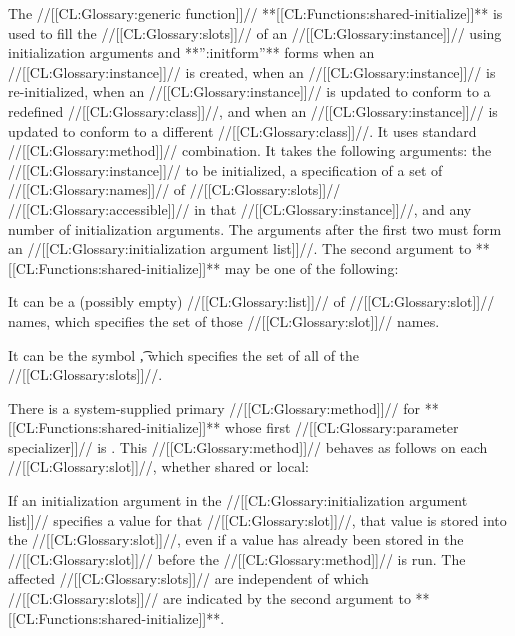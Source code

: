  
                       The //[[CL:Glossary:generic function]]// **[[CL:Functions:shared-initialize]]** is used to fill the  //[[CL:Glossary:slots]]// of an //[[CL:Glossary:instance]]//  using initialization arguments and **'':initform''** forms when an //[[CL:Glossary:instance]]// is created, when an  //[[CL:Glossary:instance]]// is re-initialized, when an //[[CL:Glossary:instance]]//  is updated to conform to a redefined //[[CL:Glossary:class]]//, and when an //[[CL:Glossary:instance]]// is updated to conform to a different //[[CL:Glossary:class]]//. It uses standard //[[CL:Glossary:method]]// combination. It takes the following arguments: the //[[CL:Glossary:instance]]// to be initialized, a  specification of a set of //[[CL:Glossary:names]]// of //[[CL:Glossary:slots]]// //[[CL:Glossary:accessible]]// in that //[[CL:Glossary:instance]]//, and any number of initialization arguments.  The arguments after the first two must form an //[[CL:Glossary:initialization argument list]]//.
                         The second argument to **[[CL:Functions:shared-initialize]]** may be one of the following:

\beginlist

\itemitem{\bull} It can be a (possibly empty) //[[CL:Glossary:list]]// of //[[CL:Glossary:slot]]// names, which specifies the set of those //[[CL:Glossary:slot]]// names. 

\itemitem{\bull} It can be the symbol \t, which specifies the set of all of the //[[CL:Glossary:slots]]//.

\endlist
                                                There is a system-supplied primary //[[CL:Glossary:method]]// for **[[CL:Functions:shared-initialize]]** whose first //[[CL:Glossary:parameter specializer]]// is . This //[[CL:Glossary:method]]// behaves as follows on each //[[CL:Glossary:slot]]//,  whether shared or local:

\beginlist

\itemitem{\bull} If an initialization argument in the  //[[CL:Glossary:initialization argument list]]// specifies a value for that //[[CL:Glossary:slot]]//,  that value is stored into the //[[CL:Glossary:slot]]//, even if a value has already been stored in the //[[CL:Glossary:slot]]// before the //[[CL:Glossary:method]]// is run.   The affected //[[CL:Glossary:slots]]// are independent of which //[[CL:Glossary:slots]]// are indicated by the second argument to **[[CL:Functions:shared-initialize]]**.


